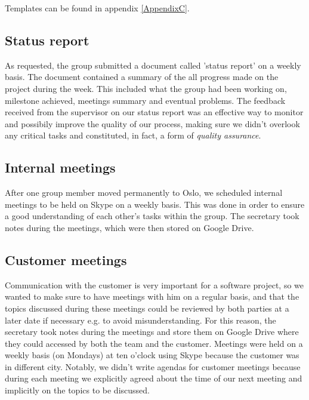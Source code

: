 Templates can be found in appendix \ref{AppendixC}.

\subsection{Status report}
As requested, the group submitted a document called 'status report' on a weekly basis.
The document contained a summary of the all progress made on the project during the week.
This included what the group had been working on, milestone achieved, meetings summary and eventual problems.
The feedback received from the supervisor on our status report was an effective way to monitor and possibily improve
the quality of our process, making sure we didn't overlook any critical tasks and constituted, in fact, a form of
\textit{quality assurance}.

\subsection{Internal meetings}
After one group member moved permanently to Oslo, we scheduled internal meetings to be held on Skype
on a weekly basis. This was done in order to ensure a good understanding of each other's tasks within the group.
The secretary took notes during the meetings, which were then stored on Google Drive.

\subsection{Customer meetings}
Communication with the customer is very important for a software project, so we wanted to make sure to have meetings
with him on a regular basis, and that the topics discussed during these meetings could be reviewed by
both parties at a later date if necessary e.g. to avoid misunderstanding.
For this reason, the secretary took notes during the meetings and store them on Google Drive where they
could accessed by both the team and the customer. Meetings were held on a weekly basis (on Mondays) at ten o'clock using
Skype because the customer was in different city.
Notably, we didn't write agendas for customer meetings because during each meeting we explicitly
agreed about the time of our next meeting and implicitly on the topics to be discussed.

